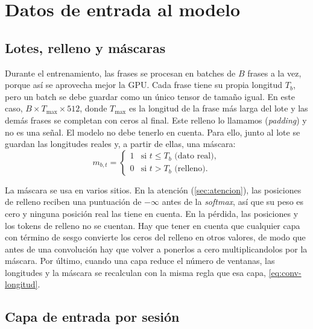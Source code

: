 \section{Datos de entrada al modelo}
\label{sec:datos-entrada}

\subsection{Lotes, relleno y máscaras}
\label{sec:mascaras}

Durante el entrenamiento, las frases se procesan en batches de $B$ frases a la vez, porque así se aprovecha mejor la GPU. Cada frase tiene su propia longitud $T_b$, pero un batch se debe guardar como un único tensor de tamaño igual. En este caso, $B \times T_{\max} \times 512$, donde $T_{\max}$ es la longitud de la frase más larga del lote y las demás frases se completan con ceros al final. Este relleno lo llamamos (\textit{padding}) y no es una señal. El modelo no debe tenerlo en cuenta. Para ello, junto al lote se guardan las longitudes reales y, a partir de ellas, una máscara:
\begin{equation}
 m_{b,t} =
  \begin{cases}
    1 & \text{si } t \le T_b \text{ (dato real)},\\
    0 & \text{si } t > T_b \text{ (relleno)}.
  \end{cases}
  \label{eq:mascara}
\end{equation}

La máscara se usa en varios sitios. En la atención (\cref{sec:atencion}), las posiciones de relleno reciben una puntuación de $-\infty$ antes de la \textit{softmax}, así que su peso es cero y ninguna posición real las tiene en cuenta. En la pérdida, las posiciones y los tokens de relleno no se cuentan. Hay que tener en cuenta que cualquier capa con término de sesgo convierte los ceros del relleno en otros valores, de modo que antes de una convolución hay que volver a ponerlos a cero multiplicandolos por la máscara. Por último, cuando una capa reduce el número de ventanas, las longitudes y la máscara se recalculan con la misma regla que esa capa, \cref{eq:conv-longitud}.

\subsection{Capa de entrada por sesión}
\label{sec:capa-sesion}

